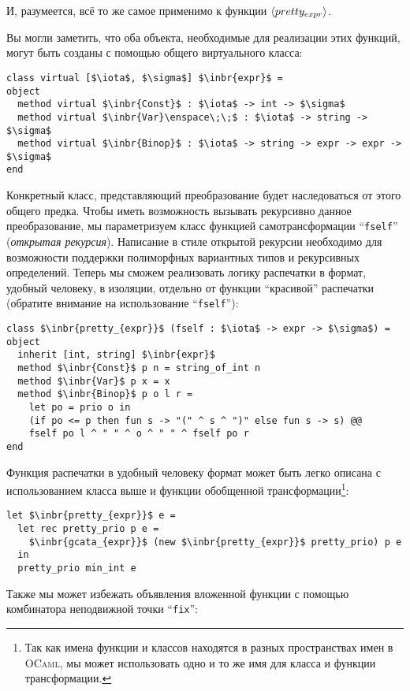И, разумеется, всё то же  самое применимо к функции $\left<pretty_{expr}\right>$.

Вы могли заметить, что оба объекта, необходимые для реализации этих функций, могут быть созданы с помощью общего виртуального класса:

\begin{lstlisting}
class virtual [$\iota$, $\sigma$] $\inbr{expr}$ =
object
  method virtual $\inbr{Const}$ : $\iota$ -> int -> $\sigma$
  method virtual $\inbr{Var}\enspace\;\;$ : $\iota$ -> string -> $\sigma$
  method virtual $\inbr{Binop}$ : $\iota$ -> string -> expr -> expr -> $\sigma$  
end
\end{lstlisting}

Конкретный класс, представляющий преобразование будет наследоваться от этого общего предка. Чтобы иметь возможность 
вызывать рекурсивно данное преобразование, мы параметризуем класс функцией самотрансформации ``\lstinline{fself}'' 
(\emph{открытая рекурсия}). 
Написание в стиле открытой рекурсии необходимо для возможности поддержки полиморфных вариантных типов и рекурсивных определений.
Теперь мы сможем реализовать логику распечатки в формат, удобный человеку, в изоляции, отдельно от функции ``красивой'' распечатки
 (обратите внимание на использование ``\lstinline{fself}''):

\begin{lstlisting}
class $\inbr{pretty_{expr}}$ (fself : $\iota$ -> expr -> $\sigma$) = object 
  inherit [int, string] $\inbr{expr}$ 
  method $\inbr{Const}$ p n = string_of_int n
  method $\inbr{Var}$ p x = x
  method $\inbr{Binop}$ p o l r =
    let po = prio o in
    (if po <= p then fun s -> "(" ^ s ^ ")" else fun s -> s) @@
    fself po l ^ " " ^ o ^ " " ^ fself po r
end
\end{lstlisting}

Функция распечатки в удобный человеку формат может быть легко описана с использованием класса выше и функции обобщенной 
трансформации\footnote{Так как имена функции и классов находятся в разных пространствах имен в \textsc{OCaml}, мы может 
использовать одно и то же имя для класса и функции трансформации.}:

\begin{lstlisting}
let $\inbr{pretty_{expr}}$ e =
  let rec pretty_prio p e = 
    $\inbr{gcata_{expr}}$ (new $\inbr{pretty_{expr}}$ pretty_prio) p e 
  in
  pretty_prio min_int e
\end{lstlisting}

Также мы может избежать объявления вложенной функции с помощью комбинатора неподвижной точки ``\lstinline{fix}'':

